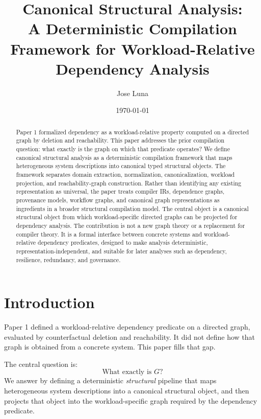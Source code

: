 \documentclass[11pt]{article}
\title{Canonical Structural Analysis:\\
A Deterministic Compilation Framework for Workload-Relative Dependency Analysis}
\author{Jose Luna}
\date{\today}
\begin{document}
\maketitle

\pagestyle{fancy}
\fancyfoot[C]{\thepage}
\renewcommand{\headrulewidth}{0.4pt}
\renewcommand{\footrulewidth}{0pt}

\begin{abstract}
Paper 1 formalized dependency as a workload-relative property computed on a directed graph by deletion and reachability. This paper addresses the prior compilation question: what exactly is the graph on which that predicate operates?
We define canonical structural analysis as a deterministic compilation framework that maps heterogeneous system descriptions into canonical typed structural objects. The framework separates domain extraction, normalization, canonicalization, workload projection, and reachability-graph construction. Rather than identifying any existing representation as universal, the paper treats compiler IRs, dependence graphs, provenance models, workflow graphs, and canonical graph representations as ingredients in a broader structural compilation model.
The central object is a canonical structural object from which workload-specific directed graphs can be projected for dependency analysis. The contribution is not a new graph theory or a replacement for compiler theory. It is a formal interface between concrete systems and workload-relative dependency predicates, designed to make analysis deterministic, representation-independent, and suitable for later analyses such as dependency, resilience, redundancy, and governance.
\end{abstract}
\section{Introduction}
\label{sec:introduction}
Paper 1 defined a workload-relative dependency predicate on a directed graph, evaluated by counterfactual deletion and reachability. It did not define how that graph is obtained from a concrete system. This paper fills that gap.

The central question is:
\[
\text{What exactly is } G?
\]
We answer by defining a deterministic \emph{structural} pipeline that maps heterogeneous system descriptions into a canonical structural object, and then projects that object into the workload-specific graph required by the dependency predicate.
\end{document}
